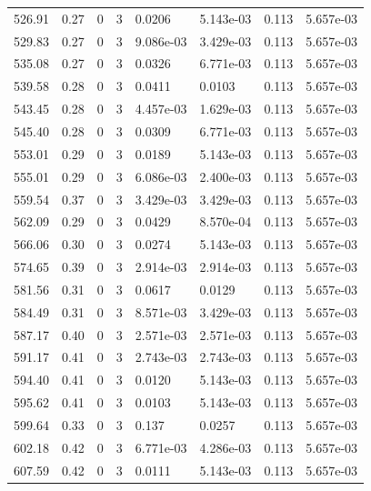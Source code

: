 \documentclass[preview]{standalone}
\begin{document}
{{{{{\begin{tabular}{L{1.2cm}C{1.2cm} C{0.3cm}C{0.5cm} C{1.4cm}C{1.4cm} C{1.4cm}C{1.4cm}}
  526.91  &  0.27  & 0     &  3 &  0.0206  & 5.143e-03  & 0.113 &  5.657e-03   \\ 
  529.83  &  0.27  & 0     &  3 &  9.086e-03  & 3.429e-03  & 0.113 &  5.657e-03   \\ 
  535.08  &  0.27  & 0     &  3 &  0.0326  & 6.771e-03  & 0.113 &  5.657e-03   \\ 
  539.58  &  0.28  & 0     &  3 &  0.0411  & 0.0103  & 0.113 &  5.657e-03   \\ 
  543.45  &  0.28  & 0     &  3 &  4.457e-03  & 1.629e-03  & 0.113 &  5.657e-03   \\ 
  545.40  &  0.28  & 0     &  3 &  0.0309  & 6.771e-03  & 0.113 &  5.657e-03   \\ 
  553.01  &  0.29  & 0     &  3 &  0.0189  & 5.143e-03  & 0.113 &  5.657e-03   \\ 
  555.01  &  0.29  & 0     &  3 &  6.086e-03  & 2.400e-03  & 0.113 &  5.657e-03   \\ 
  559.54  &  0.37  & 0     &  3 &  3.429e-03  & 3.429e-03  & 0.113 &  5.657e-03   \\ 
  562.09  &  0.29  & 0     &  3 &  0.0429  & 8.570e-04  & 0.113 &  5.657e-03   \\ 
  566.06  &  0.30  & 0     &  3 &  0.0274  & 5.143e-03  & 0.113 &  5.657e-03   \\ 
  574.65  &  0.39  & 0     &  3 &  2.914e-03  & 2.914e-03  & 0.113 &  5.657e-03   \\ 
  581.56  &  0.31  & 0     &  3 &  0.0617  & 0.0129  & 0.113 &  5.657e-03   \\ 
  584.49  &  0.31  & 0     &  3 &  8.571e-03  & 3.429e-03  & 0.113 &  5.657e-03   \\ 
  587.17  &  0.40  & 0     &  3 &  2.571e-03  & 2.571e-03  & 0.113 &  5.657e-03   \\ 
  591.17  &  0.41  & 0     &  3 &  2.743e-03  & 2.743e-03  & 0.113 &  5.657e-03   \\ 
  594.40  &  0.41  & 0     &  3 &  0.0120  & 5.143e-03  & 0.113 &  5.657e-03   \\ 
  595.62  &  0.41  & 0     &  3 &  0.0103  & 5.143e-03  & 0.113 &  5.657e-03   \\ 
  599.64  &  0.33  & 0     &  3 &  0.137  & 0.0257  & 0.113 &  5.657e-03   \\ 
  602.18  &  0.42  & 0     &  3 &  6.771e-03  & 4.286e-03  & 0.113 &  5.657e-03   \\ 
  607.59  &  0.42  & 0     &  3 &  0.0111  & 5.143e-03  & 0.113 &  5.657e-03   \\ 

\end{tabular}}}}}}
\end{document}
